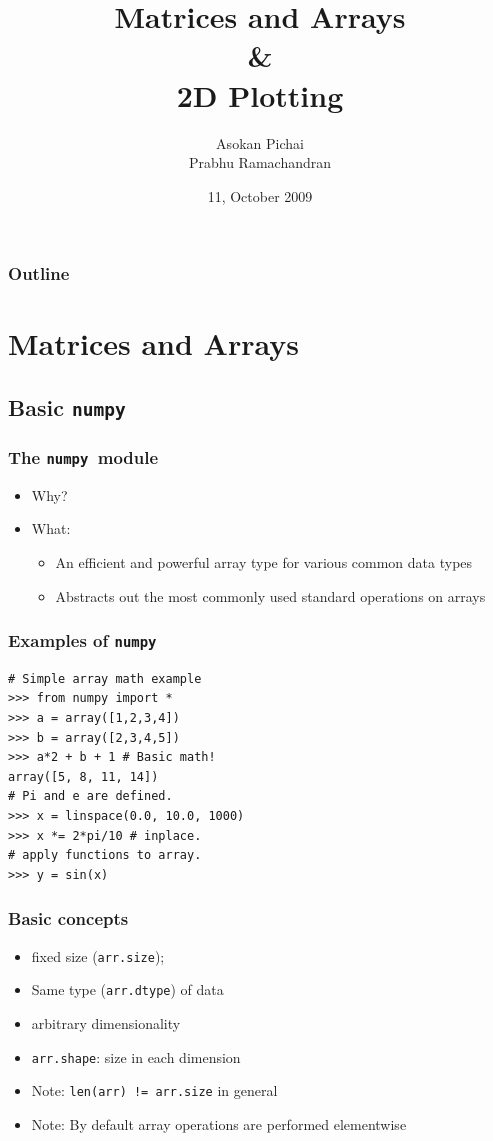 \documentclass[14pt,compress]{beamer}
\title[]{Matrices and Arrays\\ \& \\2D Plotting}
\author[Asokan \& Prabhu] {Asokan Pichai\\Prabhu Ramachandran}
\institute[FOSSEE] {FOSSEE Team}
\date[] {11, October 2009}
\newcounter{time}
\newcommand{\inctime}[1]{\addtocounter{time}{#1}{\tiny \thetime\ m}}
\newcommand{\typ}[1]{\texttt{#1}}
\begin{document}
\begin{frame}
  \maketitle
\end{frame}

\begin{frame}
  \frametitle{Outline}
  \tableofcontents
\end{frame}

\section{Matrices and Arrays}

\subsection{Basic \typ{numpy} }

\newcommand{\num}{\texttt{numpy}}

\begin{frame}
  \frametitle{The \num\ module}
  \begin{itemize}
      \item Why?
  \item What:
    \begin{itemize}
    \item An efficient and powerful array type for various common data
      types
    \item Abstracts out the most commonly used standard operations on
      arrays
    \end{itemize}
  \end{itemize}
\end{frame}

\begin{frame}[fragile]
  \frametitle{Examples of \num}
\begin{lstlisting}
# Simple array math example
>>> from numpy import *
>>> a = array([1,2,3,4])
>>> b = array([2,3,4,5])
>>> a*2 + b + 1 # Basic math!
array([5, 8, 11, 14])
# Pi and e are defined.
>>> x = linspace(0.0, 10.0, 1000)
>>> x *= 2*pi/10 # inplace.
# apply functions to array.
>>> y = sin(x)
\end{lstlisting}
\inctime{5}
\end{frame}

\begin{frame}
  \frametitle{Basic concepts}
  \begin{itemize}
  \item fixed size (\typ{arr.size});
  \item Same type (\typ{arr.dtype}) of data
  \item arbitrary dimensionality
  \item \typ{arr.shape}: size in each dimension
  \item \alert{Note:} \typ{len(arr) != arr.size} in general
  \item \alert{Note:} By default array operations are performed
    \alert{elementwise}
  \end{itemize}
\end{frame}
\end{document}
